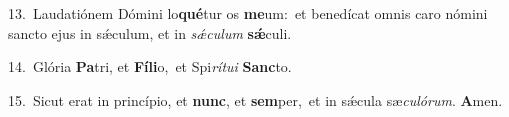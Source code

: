 {\numbfont\textcolor{\numbcolor}{13.}}~Laudatiónem Dómini lo\-\textbf{qué}\-tur os \textbf{me}\-um:~\star et benedícat omnis caro nómini sancto ejus in sǽculum, et in \textit{sǽ}\-\textit{cu}\textit{lum} \textbf{sǽ}\-culi.\par
{\numbfont\textcolor{\numbcolor}{14.}}~Glória \textbf{Pa}\-tri, et \textbf{Fí}\-\textbf{li}o,~\star et Spi\-\textit{rí}\-\textit{tu}\textit{i} \textbf{Sanc}\-to.\par
{\numbfont\textcolor{\numbcolor}{15.}}~Sicut erat in princípio, et \textbf{nunc}\-, et \textbf{sem}\-per,~\star et in sǽcula sæ\-\textit{cu}\-\textit{ló}\textit{rum}. \textbf{A}\-men.\par
